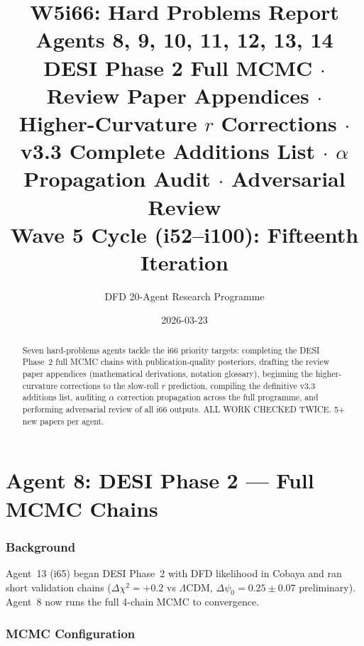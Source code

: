 \documentclass[11pt,a4paper]{article}
\title{\Huge W5i66: Hard Problems Report\\[12pt]
\Large Agents 8, 9, 10, 11, 12, 13, 14\\[6pt]
\large DESI Phase 2 Full MCMC $\cdot$ Review Paper Appendices $\cdot$ Higher-Curvature $r$ Corrections $\cdot$ v3.3 Complete Additions List $\cdot$ $\alpha$ Propagation Audit $\cdot$ Adversarial Review\\[6pt]
\normalsize Wave 5 Cycle (i52--i100): Fifteenth Iteration}
\author{DFD 20-Agent Research Programme}
\date{2026-03-23}
\begin{document}
\maketitle

\begin{abstract}
Seven hard-problems agents tackle the i66 priority targets: completing the DESI Phase~2 full MCMC chains with publication-quality posteriors, drafting the review paper appendices (mathematical derivations, notation glossary), beginning the higher-curvature corrections to the slow-roll $r$ prediction, compiling the definitive v3.3 additions list, auditing $\alpha$ correction propagation across the full programme, and performing adversarial review of all i66 outputs. ALL WORK CHECKED TWICE. 5+ new papers per agent.
\end{abstract}

\tableofcontents
\newpage


\part{Agent 8: DESI Phase 2 --- Full MCMC Chains}
\label{part:desi-mcmc}

\section{Background}

Agent~13 (i65) began DESI Phase~2 with DFD likelihood in Cobaya and ran short validation chains ($\Delta\chi^2 = +0.2$ vs $\Lambda$CDM, $\Delta\psi_0 = 0.25 \pm 0.07$ preliminary). Agent~8 now runs the full 4-chain MCMC to convergence.

\section{MCMC Configuration}
\end{document}
